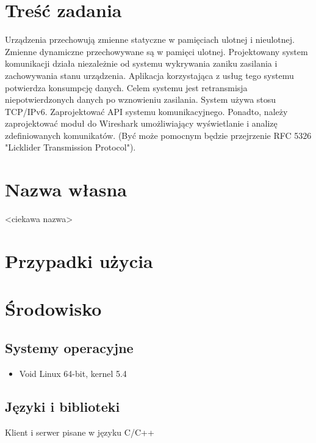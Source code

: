 \documentclass{article}
\begin{document}
\section{Treść zadania\label{tresc}}

Urządzenia przechowują zmienne statyczne w pamięciach ulotnej i nieulotnej. Zmienne dynamiczne przechowywane są w pamięci ulotnej. Projektowany system komunikacji działa niezależnie od systemu wykrywania zaniku zasilania i zachowywania stanu urządzenia. Aplikacja korzystająca z usług tego systemu potwierdza konsumpcję danych. Celem systemu jest retransmisja niepotwierdzonych danych po wznowieniu zasilania. System używa stosu TCP/IPv6. Zaprojektować API systemu komunikacyjnego. Ponadto, należy zaprojektować moduł do Wireshark umożliwiający wyświetlanie i analizę zdefiniowanych komunikatów. (Być może pomocnym będzie przejrzenie RFC 5326 "Licklider Transmission Protocol").

\section{Nazwa własna\label{nazwa}}

<ciekawa nazwa>

\section{Przypadki użycia\label{przyp}}



\section{Środowisko\label{srod}}

\subsection{Systemy operacyjne}

\begin{itemize}

\item Void Linux 64-bit, kernel 5.4

\end{itemize}

\subsection{Języki i biblioteki}

Klient i serwer pisane w języku C/C++
\end{document}
